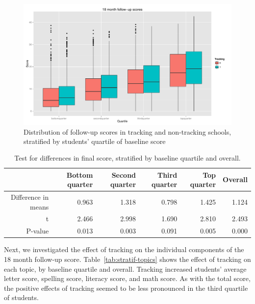 \documentclass[11pt]{article}
\begin{document}
  \begin{figure}[H]
 \centering
 \includegraphics[scale=0.4]{tracking-stratif.pdf}
 \caption{Distribution of follow-up scores in tracking and non-tracking schools, stratified by students' quartile of baseline score}
 \label{fig:tracking-stratif}
 \end{figure} 
\begin{table}[ht]
\centering
\begin{tabular}{rrrrrr}
  \hline
 & Bottom quarter & Second quarter & Third quarter & Top quarter & Overall \\ 
  \hline
Difference in means & 0.963 & 1.318 & 0.798 & 1.425 & 1.124 \\ 
  t & 2.466 & 2.998 & 1.690 & 2.810 & 2.493 \\ 
  P-value & 0.013 & 0.003 & 0.091 & 0.005 & 0.000 \\ 
   \hline
\end{tabular}
\caption{Test for differences in final score, stratified by baseline quartile and overall.} \label{tab:tracking-stratif}
\end{table} %

Next, we investigated the effect of tracking on the individual components of the 18 month follow-up score.  Table~\ref{tab:stratif-topics} shows the effect of tracking on each topic, by baseline quartile and overall.  Tracking increased students' average letter score, spelling score, literacy score, and math score.  As with the total score, the positive effects of tracking seemed to be less pronounced in the third quartile of students. \\
\end{document}

